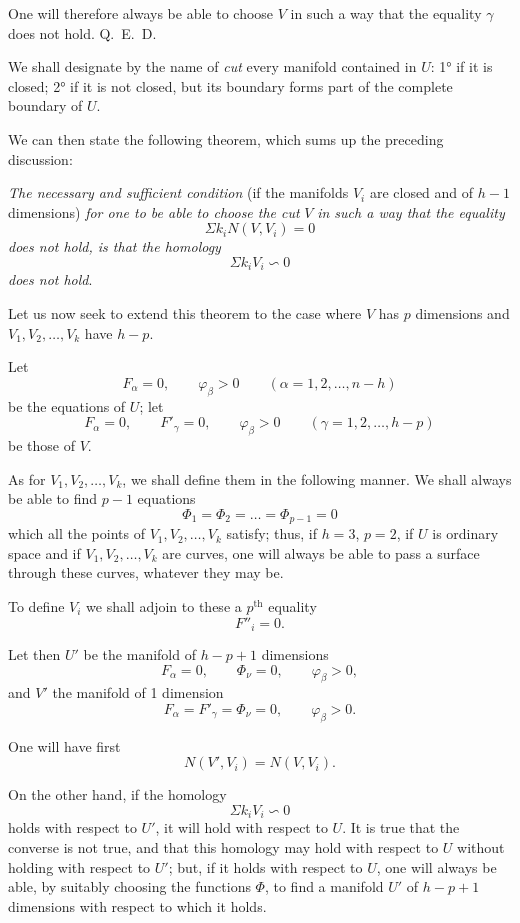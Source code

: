 \documentclass{article}
\begin{document}
One will therefore always be able to choose $V$ in such a way that the equality $\gamma$ does not hold. Q.~E.~D.

We shall designate by the name of \emph{cut} every manifold contained in $U$: 1° if it is closed; 2° if it is not closed, but its boundary forms part of the complete boundary of $U$.

We can then state the following theorem, which sums up the preceding discussion:

\emph{The necessary and sufficient condition} (if the manifolds $V_{i}$ are closed and of $h-1$ dimensions) \emph{for one to be able to choose the cut} $V$ \emph{in such a way that the equality}
\[
\Sigma k_{i}N(V, V_{i}) = 0
\]
\emph{does not hold, is that the homology}
\[
\Sigma k_{i}V_{i} \backsim 0
\]
\emph{does not hold}.

Let us now seek to extend this theorem to the case where $V$ has $p$ dimensions and $V_{1}, V_{2}, \ldots, V_{k}$ have $h-p$.

Let
\[
F_{\alpha} = 0, \qquad \varphi_{\beta} > 0 \qquad (\alpha = 1, 2, \ldots, n-h)
\]
be the equations of $U$; let
\[
F_{\alpha} = 0, \qquad F'_{\gamma} = 0, \qquad \varphi_{\beta} > 0 \qquad (\gamma = 1, 2, \ldots, h-p)
\]
be those of $V$.

As for $V_{1}, V_{2}, \ldots, V_{k}$, we shall define them in the following manner. We shall always be able to find $p-1$ equations
\[
\Phi_{1} = \Phi_{2} = \ldots = \Phi_{p-1} = 0
\]
which all the points of $V_{1}, V_{2}, \ldots, V_{k}$ satisfy; thus, if $h = 3$, $p = 2$, if $U$ is ordinary space and if $V_{1}, V_{2}, \ldots, V_{k}$ are curves, one will always be able to pass a surface through these curves, whatever they may be.

To define $V_{i}$ we shall adjoin to these a $p^{\text{th}}$ equality
\[
F''_{i} = 0.
\]

Let then $U'$ be the manifold of $h-p+1$ dimensions
\[
F_{\alpha} = 0, \qquad \Phi_{\nu} = 0, \qquad \varphi_{\beta} > 0,
\]
and $V'$ the manifold of 1 dimension
\[
F_{\alpha} = F'_{\gamma} = \Phi_{\nu} = 0, \qquad \varphi_{\beta} > 0.
\]

One will have first
\[
N(V', V_{i}) = N(V, V_{i}).
\]

On the other hand, if the homology
\[
\Sigma k_{i}V_{i} \backsim 0
\]
holds with respect to $U'$, it will hold with respect to $U$. It is true that the converse is not true, and that this homology may hold with respect to $U$ without holding with respect to $U'$; but, if it holds with respect to $U$, one will always be able, by suitably choosing the functions $\Phi$, to find a manifold $U'$ of $h-p+1$ dimensions with respect to which it holds.
\end{document}
